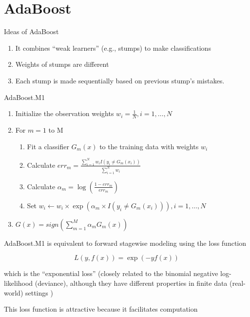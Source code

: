 \documentclass[
]{book}
\providecommand{\tightlist}{%
  \setlength{\itemsep}{0pt}\setlength{\parskip}{0pt}}
\begin{document}
\hypertarget{adaboost}{%
\section{AdaBoost}\label{adaboost}}

Ideas of AdaBoost

\begin{enumerate}
\def\labelenumi{\arabic{enumi}.}
\tightlist
\item
  It combines ``weak learners'' (e.g., stumps) to make classifications
\item
  Weights of stumps are different
\item
  Each stump is made sequentially based on previous stump's mistakes.
\end{enumerate}

AdaBoost.M1

\begin{enumerate}
\def\labelenumi{\arabic{enumi}.}
\item
  Initialize the observation weights \(w_i = \frac{1}{N}, i = 1, \dots, N\)
\item
  For \(m = 1\) to M

  \begin{enumerate}
  \def\labelenumii{\arabic{enumii}.}
  \item
    Fit a classifier \(G_m(x)\) to the training data with weights \(w_i\)
  \item
    Calculate \(err_m = \frac{\sum_{i=1}^{N} w_i I(y_i \neq G_m(x_i))}{\sum_{i=1}^N w_i}\)
  \item
    Calculate \(\alpha_m = \log (\frac{1 - err_m}{err_m})\)
  \item
    Set \(w_i \leftarrow w_i \times \exp(\alpha_m \times I (y_i \neq G_m(x_i))), i = 1, \dots, N\)
  \end{enumerate}
\item
  \(G(x) = sign(\sum_{m=1}^M \alpha_m G_m(x))\)
\end{enumerate}

AdaBoost.M1 is equivalent to forward stagewise modeling using the loss function \citep[10.4]{hastie2001a}

\[
L(y, f(x)) = \exp(-y f(x))
\]

which is the ``exponential loss'' (closely related to the binomial negative log-likelihood (deviance), although they have different properties in finite data (real-world) settings )

This loss function is attractive because it facilitates computation
\end{document}
